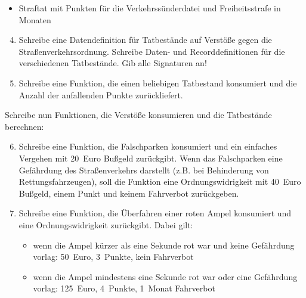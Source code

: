 \begin{aufgabe}
\begin{itemize}
  \item Straftat mit Punkten für die Verkehrssünderdatei und
    Freiheitsstrafe in Monaten
  \end{itemize}
  
  \begin{enumerate} \setcounter{enumii}{3}
  \item Schreibe eine Datendefinition für
    Tatbestände auf Verstöße gegen die Straßenverkehrsordnung.
    Schreibe Daten- und Recorddefinitionen für die verschiedenen
    Tatbestände.  Gib alle Signaturen an!

  \item Schreibe eine Funktion, die einen
    beliebigen Tatbestand konsumiert und die Anzahl der anfallenden
    Punkte zurückliefert.
  \end{enumerate}

  Schreibe nun Funktionen, die Verstöße konsumieren und die
  Tatbestände berechnen:

  \begin{enumerate} \setcounter{enumii}{5}
  \item Schreibe eine Funktion, die Falschparken
    konsumiert und ein einfaches Vergehen mit 20~Euro Bußgeld zurückgibt.
    Wenn das Falschparken eine Gefährdung des Straßenverkehrs
    darstellt (z.B.  bei Behinderung von Rettungsfahrzeugen),
    soll die Funktion eine Ordnungswidrigkeit mit 40~Euro Bußgeld,
    einem Punkt und keinem Fahrverbot zurückgeben.

  \item Schreibe eine Funktion, die Überfahren
    einer roten Ampel konsumiert und eine Ordnungswidrigkeit
    zurückgibt.  Dabei gilt:
    \begin{itemize}
    \item wenn die Ampel kürzer als eine Sekunde rot war und keine
      Gefährdung vorlag: 50~Euro, 3~Punkte, kein Fahrverbot
    \item wenn die Ampel mindestens eine Sekunde rot war oder eine
      Gefährdung vorlag: 125~Euro, 4~Punkte, 1~Monat Fahrverbot
    \end{itemize}


\end{enumerate}
\end{aufgabe}
